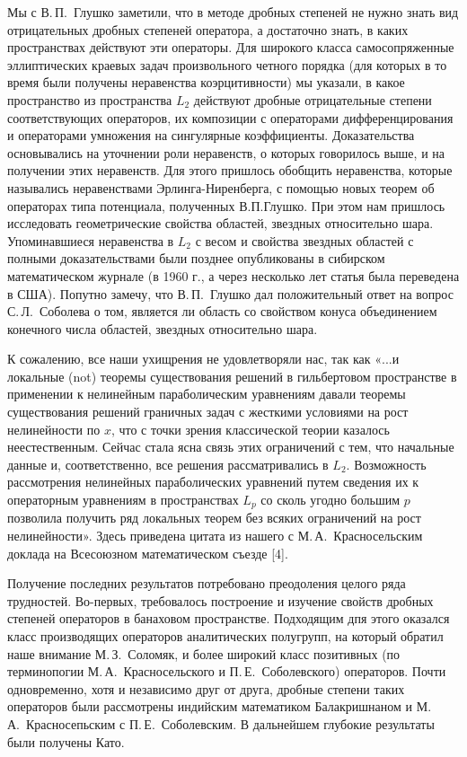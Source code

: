 Мы с В.\,П.~Глушко заметили, что в методе дробных степеней не нужно знать вид отрицательных дробных степеней оператора,
а достаточно знать, в каких пространствах действуют эти операторы.
Для широкого класса самосопряженные эллиптических краевых задач произвольного четного порядка
(для которых в то время были получены неравенства коэрцитивности) мы указали, в какое пространство из пространства $L_2$
действуют дробные отрицательные степени соответствующих операторов,
их композиции с операторами дифференцирования и операторами умножения на сингулярные коэффициенты.
Доказательства основывались на уточнении роли неравенств, о которых говорилось выше, и на получении этих неравенств.
Для этого пришлось обобщить неравенства, которые назывались неравенствами Эрлинга-Ниренберга,
с помощью новых теорем об операторах типа потенциала, полученных В.П.Глушко.
При этом нам пришлось исследовать геометрические свойства областей, звездных относительно шара.
Упоминавшиеся неравенства в $L_2$
с весом и свойства звездных областей с полными доказательствами были позднее опубликованы
в сибирском математическом журнале (в 1960 г., а через несколько лет статья была переведена в США).
Попутно замечу, что В.\,П.~Глушко дал положительный ответ на вопрос С.\,Л.~Соболева о том, является ли область со свойством конуса объединением конечного числа областей, звездных относительно шара.

К сожалению, все наши ухищрения не удовлетворяли нас,
так как «...и локальные (not) теоремы существования решений в гильбертовом пространстве
в применении к нелинейным параболическим уравнениям давали теоремы существования решений граничных задач
с жесткими условиями на рост нелинейности по $x$,
что с точки зрения классической теории казалось неестественным.
Сейчас стала ясна связь этих ограничений с тем, что начальные данные и, соответственно,
все решения рассматривались в $L_2$.
Возможность рассмотрения нелинейных параболических уравнений путем сведения их к операторным уравнениям в пространствах $L_p$
со сколь угодно большим $p$ позволила получить ряд локальных теорем без всяких ограничений на рост нелинейности».
Здесь приведена цитата из нашего с М.\,А.~Красносельским доклада на Всесоюзном математическом съезде [4].

Получение последних результатов потребовано преодоления целого ряда трудностей.
Во-первых, требовалось построение и изучение свойств дробных степеней операторов в банаховом пространстве.
Подходящим дпя этого оказался класс производящих операторов аналитических полугрупп,
на который обратил наше внимание М.\,З.~Соломяк, и более широкий класс позитивных
(по терминопогии М.\,А.~Красносельского и П.\,Е.~Соболевского) операторов. Почти одновременно, хотя и независимо друг от друга, дробные степени таких операторов были рассмотрены индийским математиком Балакришнаном и М.\,А.~Красносепьским с П.\,Е.~Соболевским. В дальнейшем глубокие результаты были получены Като.

